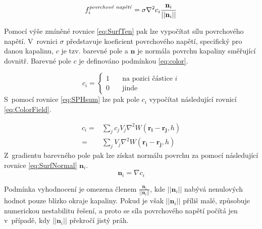 \begin{equation}
	f_i^{\text{\textit{povrchové napětí}}} = \sigma \nabla^2 c_i \frac{\mathbf{n}_i}{||\mathbf{n}_i||}
	\label{eq:SurfTen}
\end{equation}

Pomocí výše zmíněné rovnice \ref{eq:SurfTen} pak lze vypočítat sílu povrchového napětí. V~rovnici $\sigma$ představuje koeficient povrchového napětí, specifický pro danou kapalinu, $c$ je tzv. barevné pole a $\mathbf{n}$ je normála povrchu kapaliny směřující dovnitř. Barevné pole $c$ je definováno podmínkou \ref{eq:color}.

\begin{equation}
	c_i =
	\begin{cases}
		1 & \quad  \text{na pozici částice } i \\
		0 & \quad  \text{jinde}
	\end{cases}
	\label{eq:color}
\end{equation}
S~pomocí rovnice \ref{eq:SPHsum} lze pak pole $c_i$ vypočítat následující rovnicí \ref{eq:ColorField}.

\begin{equation}
	\begin{split}
		c_i =   & \sum_j c_j V_j \nabla^2 W(\mathbf{r_i} - \mathbf{r_j},h) \\
		=   & \sum_j V_j \nabla^2 W(\mathbf{r_i} - \mathbf{r_j},h)
	\end{split}
	\label{eq:ColorField}
\end{equation}
Z~gradientu barevného pole pak lze získat normálu povrchu za pomocí následující rovnice \ref{eq:SurfNormal} $\mathbf{n}_i$.
\begin{equation}
	\mathbf{n}_i = \nabla c_i
	\label{eq:SurfNormal}
\end{equation}

Podmínka vyhodnocení je omezena členem $\frac{\mathbf{n}_i}{||\mathbf{n}_i||}$, kde $||\mathbf{n}_i||$ nabývá nenulových hodnot pouze blízko okraje kapaliny. Pokud je však $||\mathbf{n}_i||$ příliš malé, způsobuje numerickou nestabilitu řešení, a proto se síla povrchového napětí počítá jen v~případě, kdy $||\mathbf{n}_i||$ překročí jistý práh.

